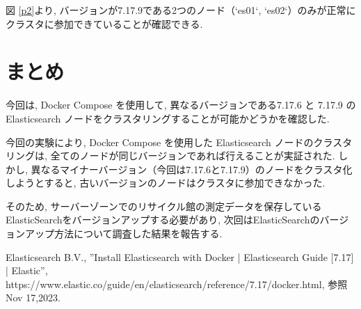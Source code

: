 \documentclass[a4j,12pt,]{jarticle}
\begin{document}
図 \ref{p2}より, バージョンが7.17.9である2つのノード（`es01`, `es02`）のみが正常にクラスタに参加できていることが確認できる.

\section{まとめ}
今回は, Docker Compose を使用して, 異なるバージョンである7.17.6 と 7.17.9 の Elasticsearch ノードをクラスタリングすることが可能かどうかを確認した.

今回の実験により, Docker Compose を使用した Elasticsearch ノードのクラスタリングは, 全てのノードが同じバージョンであれば行えることが実証された. しかし, 異なるマイナーバージョン（今回は7.17.6と7.17.9）のノードをクラスタ化しようとすると, 古いバージョンのノードはクラスタに参加できなかった.

そのため, サーバーゾーンでのリサイクル館の測定データを保存しているElasticSearchをバージョンアップする必要があり, 次回はElasticSearchのバージョンアップ方法について調査した結果を報告する.

\begin{thebibliography}{5}
  Elasticsearch B.V., ”Install Elasticsearch with Docker | Elasticsearch Guide [7.17] | Elastic”, https://www.elastic.co/guide/en/elasticsearch/reference/7.17/docker.html, 参照 Nov 17,2023.
\end{thebibliography}
\end{document}
